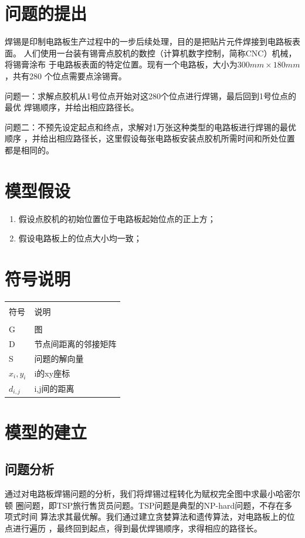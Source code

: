\documentclass[fontset=windows,a4paper,12pt]{ctexart}
\begin{document}
  \newpage
  \tableofcontents
  \newpage
  \section{问题的提出}
    焊锡是印制电路板生产过程中的一步后续处理，目的是把贴片元件焊接到电路板表面。
    人们使用一台装有锡膏点胶机的数控（计算机数字控制，简称CNC）机械，将锡膏涂布
    于电路板表面的特定位置。现有一个电路板，大小为$300mm\times180mm$，共有280
    个位点需要点涂锡膏。

    问题一：求解点胶机从1号位点开始对这280个位点进行焊锡，最后回到1号位点的最优
    焊锡顺序，并给出相应路径长。

    问题二：不预先设定起点和终点，求解对1万张这种类型的电路板进行焊锡的最优顺序
    ，并给出相应路径长，这里假设每张电路板安装点胶机所需时间和所处位置都是相同的。
  \section{模型假设}
    \begin{enumerate}
      \item 假设点胶机的初始位置位于电路板起始位点的正上方；
      \item 假设电路板上的位点大小均一致；
    \end{enumerate}
  \section{符号说明}
	  \begin{center}
	  \begin{tabular}{p{5cm}|l}
	  	\hline\\
	  	符号	&	说明\\
	  	\hline\\
	  	G	&	图\\
	  	D	&	节点间距离的邻接矩阵\\
	  	S	&	问题的解向量\\
	  	$x_i,y_i$	& i的xy座标\\
	  	$d_{i,j}$ & i,j间的距离\\
	  	\hline
	  \end{tabular}
	  \end{center}
	  
  \section{模型的建立}
    \subsection{问题分析}
      通过对电路板焊锡问题的分析，我们将焊锡过程转化为赋权完全图中求最小哈密尔顿
      圈问题，即TSP旅行售货员问题。TSP问题是典型的NP-hard问题\cite{gutin2006traveling}，不存在多项式时间
      算法求其最优解。我们通过建立贪婪算法和遗传算法，对电路板上的位点进行遍历
      ，最终回到起点，得到最优焊锡顺序，求得相应的路径长。
      
\end{document}
